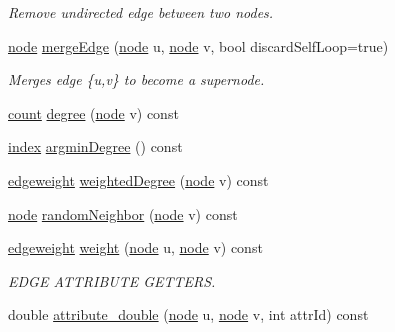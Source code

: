 \begin{DoxyCompactItemize}
\begin{DoxyCompactList}\small\item\em Remove undirected edge between two nodes. \end{DoxyCompactList}\item 
\hyperlink{namespace_networ_kit_a53fe3e4fd04ea024160e4d024dfebadf}{node} \hyperlink{class_networ_kit_1_1_graph_afb52ff7a18e33f57830f55f0766e9fca}{merge\-Edge} (\hyperlink{namespace_networ_kit_a53fe3e4fd04ea024160e4d024dfebadf}{node} u, \hyperlink{namespace_networ_kit_a53fe3e4fd04ea024160e4d024dfebadf}{node} v, bool discard\-Self\-Loop=true)
\begin{DoxyCompactList}\small\item\em Merges edge \{u,v\} to become a supernode. \end{DoxyCompactList}\item 
\hyperlink{namespace_networ_kit_a76b399edfa50ae72e4aa86007aaa800a}{count} \hyperlink{class_networ_kit_1_1_graph_a7a9ae1841eed3ab10520f89d94a50539}{degree} (\hyperlink{namespace_networ_kit_a53fe3e4fd04ea024160e4d024dfebadf}{node} v) const 
\item 
\hyperlink{namespace_networ_kit_a486772e5516be73694ef0d780b828d04}{index} \hyperlink{class_networ_kit_1_1_graph_a59ba7f101a1151e5353f51d630498d4b}{argmin\-Degree} () const 
\item 
\hyperlink{namespace_networ_kit_a831b108dbcd79dad062d9e28b1b4e3dd}{edgeweight} \hyperlink{class_networ_kit_1_1_graph_a48ace7ae9a931d69999d8fb55e563063}{weighted\-Degree} (\hyperlink{namespace_networ_kit_a53fe3e4fd04ea024160e4d024dfebadf}{node} v) const 
\item 
\hyperlink{namespace_networ_kit_a53fe3e4fd04ea024160e4d024dfebadf}{node} \hyperlink{class_networ_kit_1_1_graph_aa227bfff678a9ff316a9b829449f32d1}{random\-Neighbor} (\hyperlink{namespace_networ_kit_a53fe3e4fd04ea024160e4d024dfebadf}{node} v) const 
\item 
\hyperlink{namespace_networ_kit_a831b108dbcd79dad062d9e28b1b4e3dd}{edgeweight} \hyperlink{class_networ_kit_1_1_graph_a4cc21c97791b60088e735ef0c36583b8}{weight} (\hyperlink{namespace_networ_kit_a53fe3e4fd04ea024160e4d024dfebadf}{node} u, \hyperlink{namespace_networ_kit_a53fe3e4fd04ea024160e4d024dfebadf}{node} v) const 
\begin{DoxyCompactList}\small\item\em E\-D\-G\-E A\-T\-T\-R\-I\-B\-U\-T\-E G\-E\-T\-T\-E\-R\-S. \end{DoxyCompactList}\item 
double \hyperlink{class_networ_kit_1_1_graph_a91cffc25cb2af288ce098fb9c2fcb192}{attribute\-\_\-double} (\hyperlink{namespace_networ_kit_a53fe3e4fd04ea024160e4d024dfebadf}{node} u, \hyperlink{namespace_networ_kit_a53fe3e4fd04ea024160e4d024dfebadf}{node} v, int attr\-Id) const 

\end{DoxyCompactItemize}
